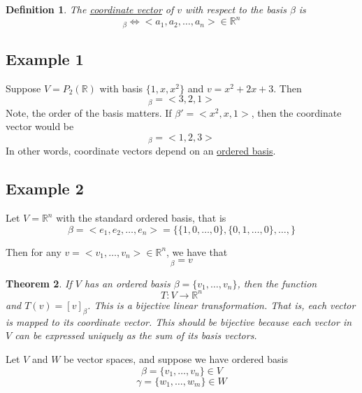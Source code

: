 \documentclass{article}
\newtheorem{theorem}{Theorem}[section]
\newtheorem{definition}[theorem]{Definition}
\newtheorem{one minute paper}[theorem]{One Minute Paper}
\begin{document}
\begin{definition}
    The \underline{coordinate vector} of $v$ with respect to the basis $\beta$ is
    \begin{equation}
        [v]_\beta \iff <a_1,a_2,\dots,a_n> \in \mathbb{R}^n
    \end{equation}
\end{definition}

\subsection*{Example 1}
Suppose $V = P_2(\mathbb{R})$ with basis $\{1,x,x^2\}$ and $v = x^2 + 2x + 3$. Then 
\begin{equation}
    [v]_\beta = <3,2,1>
\end{equation}
Note, the order of the basis matters. If $\beta' = <x^2,x,1>$, then the coordinate vector would be 
\begin{equation}
    [v]_\beta = <1,2,3>
\end{equation}
In other words, coordinate vectors depend on an \underline{ordered basis}. 

\subsection*{Example 2}

Let $V = \mathbb{R}^n$ with the standard ordered basis, that is 
\begin{equation}
    \beta = <e_1,e_2, \dots, e_n> = \{\{1,0,\dots,0\}, \{0,1,\dots,0\}, \dots, \}
\end{equation}

Then for any $v = <v_1,\dots,v_n> \in \mathbb{R}^n$, we have that 
\begin{equation}
    [v]_\beta = v
\end{equation}

\begin{theorem}
    If $V$ has an ordered basis $\beta = \{v_1, \dots, v_n\}$, then the function 
    \begin{equation}
        T: V \rightarrow \mathbb{R}^n
    \end{equation}
    and $T(v) = [v]_\beta$. This is a bijective linear transformation. That is, each vector is mapped to its coordinate vector.
    This should be bijective because each vector in $V$ can be expressed uniquely as the sum of its basis vectors. 
\end{theorem}

Let $V$ and $W$ be vector spaces, and suppose we have ordered basis 
\begin{equation}
    \beta = \{v_1,\dots,v_n\} \in V
\end{equation}
\begin{equation}
    \gamma = \{w_1,\dots,w_m\} \in W
\end{equation}
\end{document}
